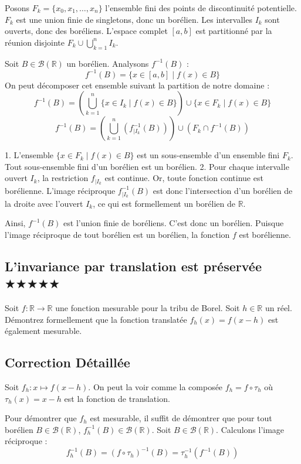 \documentclass[11pt,a4paper]{article}
\begin{document}
Posons $F_k = \{x_0, x_1, \dots, x_n\}$ l'ensemble fini des points de discontinuité potentielle.
$F_k$ est une union finie de singletons, donc un borélien.
Les intervalles $I_k$ sont ouverts, donc des boréliens. L'espace complet $[a,b]$ est partitionné par la réunion disjointe $F_k \cup \bigcup_{k=1}^n I_k$.

Soit $B \in \mathcal{B}(\mathbb{R})$ un borélien. Analysons $f^{-1}(B)$ :
$$ f^{-1}(B) = \{x \in [a,b] \mid f(x) \in B\} $$
On peut décomposer cet ensemble suivant la partition de notre domaine :
$$ f^{-1}(B) = \left( \bigcup_{k=1}^n \{x \in I_k \mid f(x) \in B\} \right) \cup \{x \in F_k \mid f(x) \in B\} $$
$$ f^{-1}(B) = \left( \bigcup_{k=1}^n (f_{|I_k}^{-1}(B)) \right) \cup (F_k \cap f^{-1}(B)) $$

1. L'ensemble $\{x \in F_k \mid f(x) \in B\}$ est un sous-ensemble d'un ensemble fini $F_k$. Tout sous-ensemble fini d'un borélien est un borélien.
2. Pour chaque intervalle ouvert $I_k$, la restriction $f_{|I_k}$ est continue. Or, toute fonction continue est borélienne. L'image réciproque $f_{|I_k}^{-1}(B)$ est donc l'intersection d'un borélien de la droite avec l'ouvert $I_k$, ce qui est formellement un borélien de $\mathbb{R}$.

Ainsi, $f^{-1}(B)$ est l'union finie de boréliens. C'est donc un borélien.
Puisque l'image réciproque de tout borélien est un borélien, la fonction $f$ est borélienne.


\vspace{0.5cm}

\subsection*{L'invariance par translation est préservée \quad $\bigstar\bigstar\bigstar\bigstar\bigstar$}

Soit $f : \mathbb{R} \to \mathbb{R}$ une fonction mesurable pour la tribu de Borel. Soit $h \in \mathbb{R}$ un réel.
Démontrez formellement que la fonction translatée $f_h(x) = f(x - h)$ est également mesurable.

\subsection*{Correction Détaillée}

Soit $f_h : x \mapsto f(x - h)$. On peut la voir comme la composée $f_h = f \circ \tau_h$ où $\tau_h(x) = x - h$ est la fonction de translation.

Pour démontrer que $f_h$ est mesurable, il suffit de démontrer que pour tout borélien $B \in \mathcal{B}(\mathbb{R})$, $f_h^{-1}(B) \in \mathcal{B}(\mathbb{R})$.
Soit $B \in \mathcal{B}(\mathbb{R})$.
Calculons l'image réciproque :
$$ f_h^{-1}(B) = (f \circ \tau_h)^{-1}(B) = \tau_h^{-1}(f^{-1}(B)) $$
\end{document}
